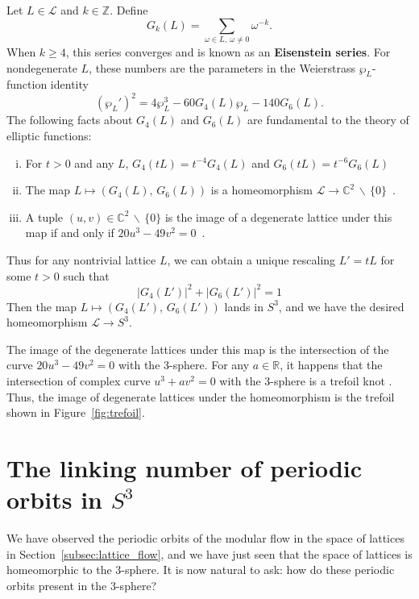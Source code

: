 \documentclass[12pt,twoside]{reedthesis}
\theoremstyle{definition}
\newcommand{\Z}{\mathbb{Z}}
\newcommand{\R}{\mathbb{R}}
\newcommand{\C}{\mathbb{C}}
\newcommand{\LS}{\mathcal{L}}
\newcommand{\wo}{\, \backslash \,}
\newcommand{\defnphrase}[1]{\textbf{#1}}
\begin{document}
Let $L \in \LS$ and $k \in \Z$.
Define
\begin{equation*}
  G_k(L) = \sum_{\omega \in L,\ \omega \neq 0} \omega^{-k}.
\end{equation*}
When $k \geq 4$, this series converges and is known as an \defnphrase{Eisenstein series}.
For nondegenerate $L$, these numbers are the parameters in the Weierstrass $\wp_L$-function identity
\begin{equation*}
  (\wp_L')^2 = 4 \wp_L^3 - 60 G_4(L) \wp_L - 140 G_6(L).
\end{equation*}
The following facts about $G_4(L)$ and $G_6(L)$ are fundamental to the theory of elliptic functions:
\begin{enumerate}[(i)]
  \item For $t > 0$ and any $L$, $G_4(tL) = t^{-4} G_4(L)$ and $G_6(tL) = t^{-6} G_6(L)$~\cite[631]{abramowitz1964}
  
  \item The map $L \mapsto (G_4(L),\, G_6(L))$ is a homeomorphism $\LS \to \C^2 \wo \{ 0 \}$~\cite[82, 89]{serre1973}.

  \item A tuple $(u, v) \in \C^2 \wo \{ 0 \}$ is the image of a degenerate lattice under this map if and only if $20u^3 - 49v^2 = 0$~\cite[265]{ghys2007}.
\end{enumerate}
Thus for any nontrivial lattice $L$, we can obtain a unique rescaling $L' = tL$ for some $t > 0$ such that
\begin{equation*}
  |G_4(L')|^2 + |G_6(L')|^2 = 1
\end{equation*}
Then the map $L \mapsto (G_4(L'),\, G_6(L'))$ lands in $S^3$, and we have the desired homeomorphism $\LS \to S^3$.

The image of the degenerate lattices under this map is the intersection of the curve $20u^3 - 49v^2 = 0$ with the 3-sphere. For any $a \in \R$, it happens that the intersection of complex curve $u^3 + av^2 = 0$ with the 3-sphere is a trefoil knot \cite[4]{milnor1968}. Thus, the image of degenerate lattices under the homeomorphism is the trefoil shown in Figure~\ref{fig:trefoil}.

\section{The linking number of periodic orbits in $S^3$}\label{sec:periodic_orbits_in_s3}

We have observed the periodic orbits of the modular flow in the space of lattices in Section~\ref{subsec:lattice_flow}, and we have just seen that the space of lattices is homeomorphic to the 3-sphere.
It is now natural to ask: how do these periodic orbits present in the 3-sphere?
\end{document}
